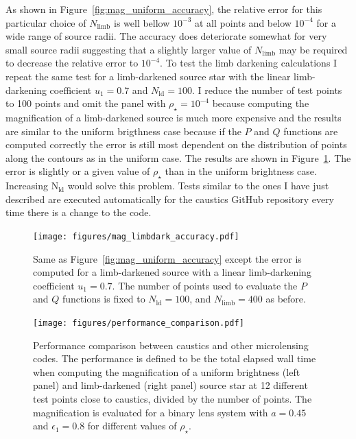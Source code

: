 \documentclass[12pt,dvipsnames]{report}
\newcommand{\ssf}[1]{\textsf{#1}}
\begin{document}
As shown in Figure~\ref{fig:mag_uniform_accuracy}, the relative error for this  particular 
choice of $N_\mathrm{limb}$ is well bellow $10^{-3}$ at all points and below $10^{-4}$ 
for a wide range of source radii. The accuracy does deteriorate somewhat for very small 
source radii suggesting that a slightly larger value of $N_\mathrm{limb}$ may be required 
to decrease the relative error to $10^{-4}$.  To test the limb darkening calculations 
I repeat the same test for a limb-darkened source star with the linear limb-darkening 
coefficient $u_1=0.7$ and $N_\mathrm{ld}=100$. I reduce the number of test points to 100 points and omit the panel
with $\rho_\star=10^{-4}$ because computing the magnification of a limb-darkened source 
is much more expensive and the results are similar to the uniform brigthness case because 
if the $P$ and $Q$ functions are computed correctly the error is still most dependent on 
the distribution of points along the contours as in the uniform case.
The results are shown in Figure~\ref{fig:mag_limbdark_accuracy}. The error is slightly 
or a given value of $\rho_\star$ than in the uniform brightness case. Increasing 
$\mathrm{N}_\mathrm{ld}$ would solve this problem.
Tests similar to the ones I have just described are executed automatically for the 
\ssf{caustics} \ssf{GitHub} repository every time there is a change to the code.

\begin{figure}[t]
    \begin{centering}
        \texttt{[image: figures/mag\_limbdark\_accuracy.pdf]}
        \caption{Same as Figure~\ref{fig:mag_uniform_accuracy} except the error is computed 
        for a limb-darkened source with a linear limb-darkening coefficient $u_1=0.7$. The 
        number of points used to evaluate the $P$ and $Q$ functions is fixed to 
        $N_\mathrm{ld}=100$, and $N_\mathrm{limb}=400$ as before.}
            \label{fig:mag_limbdark_accuracy}
    \end{centering}
\end{figure}

\begin{figure}[t]
    \begin{centering}
        \texttt{[image: figures/performance\_comparison.pdf]}
        \caption{Performance comparison between \ssf{caustics} and other microlensing codes.
        The performance is defined to be the total elapsed wall time when computing the 
        magnification of a uniform brightness (left panel) and limb-darkened (right panel) 
        source star at 12 different test points close to caustics, divided by the number of points.
        The magnification is evaluated for a binary lens system with $a=0.45$ and 
        $\epsilon_1=0.8$ for different values of $\rho_\star$.
        }
            \label{fig:performance_comparison}
    \end{centering}
\end{figure}
\end{document}
